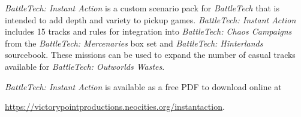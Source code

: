 \emph{BattleTech: Instant Action} is a custom scenario pack for \emph{BattleTech} that is intended to add depth and variety to pickup games.
\emph{BattleTech: Instant Action} includes 15 tracks and rules for integration into \emph{BattleTech: Chaos Campaigns} from the \emph{BattleTech: Mercenaries} box set and \emph{BattleTech: Hinterlands} sourcebook.
These missions can be used to expand the number of casual tracks available for \emph{BattleTech: Outworlds Wastes}.

\emph{BattleTech: Instant Action} is available as a free PDF to download online at

 \href{https://victorypointproductions.neocities.org/instantaction}{https://victorypointproductions.neocities.org/instantaction}.
